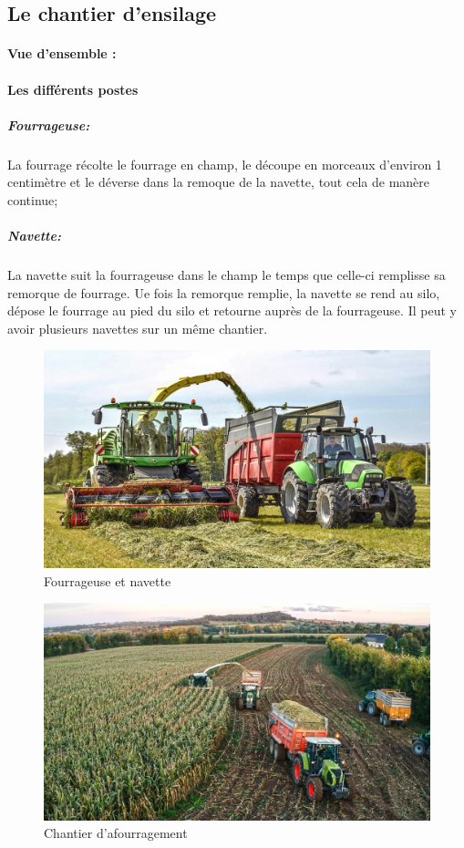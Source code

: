 \documentclass[12pt,a4paper]{report}
\begin{document}
\subsection{Le chantier d'ensilage}

\paragraph{Vue d'ensemble :} 

\paragraph{Les différents postes}
\subparagraph{Fourrageuse:} La fourrage récolte le fourrage en champ, le découpe en morceaux d'environ 1 centimètre et le déverse dans la remoque de la navette, tout cela de manère continue;
\subparagraph{Navette:} La navette suit la fourrageuse dans le champ le temps que celle-ci remplisse sa remorque de fourrage. Ue fois la remorque remplie, la navette se rend au silo, dépose le fourrage au pied du silo et retourne auprès de la fourrageuse. Il peut y avoir plusieurs navettes sur un même chantier.

\begin{figure}[H]
	\centering
	\includegraphics[width=0.7\linewidth]{img/fourrageusenavette}
	\caption{Fourrageuse et navette}
	\label{fig:fourrageusenavette}
\end{figure}

\begin{figure}[H]
	\centering
	\includegraphics[width=0.7\linewidth]{img/affourragement}
	\caption{Chantier d'afourragement}
	\label{fig:affourragement}
\end{figure}
\end{document}

